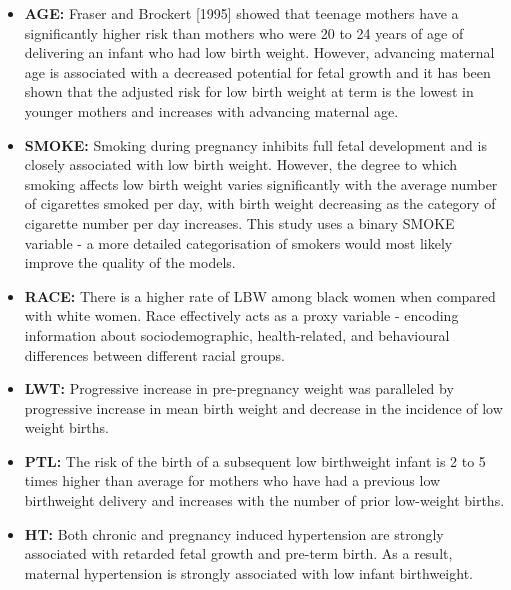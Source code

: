 \begin{itemize}
    \item \textbf{AGE:} Fraser and Brockert [1995] showed that teenage mothers have a significantly higher risk than mothers who were 20 to 24 years of age of delivering an infant who had low birth weight.\cite{AgeYoung} However, advancing maternal age is associated with a decreased potential for fetal growth and it has been shown that the adjusted risk for low birth weight at term is the lowest in younger mothers and increases with advancing maternal age.\cite{MaternalAge}
    
    \item \textbf{SMOKE:}
    Smoking during pregnancy inhibits full fetal development and is closely associated with low birth weight.\cite{SmokeLBW} However, the degree to which smoking affects low birth weight varies significantly with the average number of cigarettes smoked per day, with birth weight decreasing as the category of cigarette number per day increases.\cite{SmokeReduction} This study uses a binary SMOKE variable - a more detailed categorisation of smokers would most likely improve the quality of the models.
    
    \item \textbf{RACE:}
    There is a higher rate of LBW among black women when compared with white women.\cite{RaceDifference} Race effectively acts as a proxy variable - encoding information about sociodemographic, health-related, and behavioural differences between different racial groups.\cite{RaceLBW}
    
    \item \textbf{LWT:}
    Progressive increase in pre-pregnancy weight was paralleled by progressive increase in mean birth weight and decrease in the incidence of low weight births.\cite{Weight}
    
    \item \textbf{PTL:}
    The risk of the birth of a subsequent low birthweight infant is 2 to 5 times higher than average for mothers who have had a previous low birthweight delivery and increases with the number of prior low-weight births.\cite{bakketeig1979tendency}
    
    \item \textbf{HT:}
    Both chronic and pregnancy induced hypertension are strongly associated with retarded fetal growth and pre-term birth. As a result, maternal hypertension is strongly associated with low infant birthweight. \cite{InducedHT}\cite{HTRace}
    

\end{itemize}
